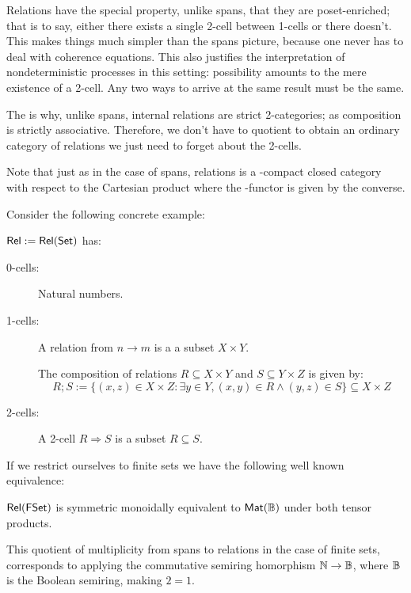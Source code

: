 Relations have the special property, unlike spans, that they are poset-enriched; that is to say, either there exists a single 2-cell between 1-cells or there doesn't. This makes things much simpler than the spans picture, because one never has to deal with coherence equations.  This also justifies the interpretation of nondeterministic processes in this setting: possibility amounts to the mere existence of a 2-cell.  Any two ways to arrive at the same result must be the same.


The is why, unlike spans, internal relations are  strict 2-categories; as  composition is strictly associative. Therefore, we don't have to quotient to obtain an ordinary category of relations we just need to forget about the 2-cells.

Note that just as in the case of spans, relations is a \dag-compact closed category with respect to the Cartesian product where the \dag-functor is given by the converse.









Consider the following concrete example:
\begin{example}
$\mathsf{Rel}:=\mathsf{Rel}(\mathsf{Set})$ has:

\begin{description}
\item[0-cells:] Natural numbers.

\item[1-cells:] A relation from $n\to m$ is a a subset $X \times Y$.

The composition of relations $R \subseteq X \times Y$  and $S \subseteq Y \times Z$ is given by:
$$
R;S := \{  (x,z) \in X\times Z: \exists y \in Y, (x,y) \in R \wedge (y,z) \in S \} \subseteq X\times Z
$$ 

\item[2-cells:] 
A 2-cell $R\Rightarrow S$ is a subset $R\subseteq S$.
\end{description}
\end{example}


If we restrict ourselves to finite sets we have the following well known equivalence:



\begin{lemma}
$\mathsf{Rel}(\mathsf{FSet})$ is symmetric monoidally equivalent to $\mathsf{Mat}(\mathbb{B})$ under both tensor products. 
\end{lemma}


This quotient of multiplicity from spans to relations in the case of finite sets, corresponds to applying the commutative semiring homorphism $\mathbb{N}\to \mathbb{B}$, where $\mathbb{B}$ is the Boolean semiring, making $2=1$.

